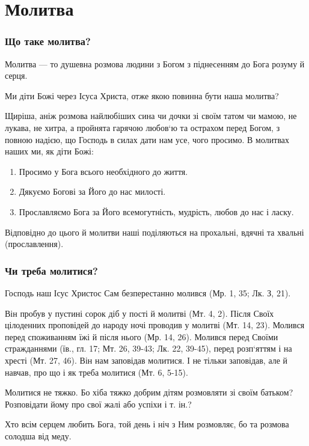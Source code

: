 \documentclass[main.tex]{subfiles}
\begin{document}
\chapter{Молитва}

\subsection{Що таке молитва?}

Молитва — то душевна розмова людини з Богом з піднесенням до Бога розуму й серця.

Ми діти Божі через Ісуса Христа, отже якою повинна бути наша молитва?

Щиріша, аніж розмова найлюбіших сина чи дочки зі своїм татом чи мамою, не лукава, не хитра, а пройнята гарячою любов`ю та острахом перед Богом, з повною надією, що Господь в силах дати нам усе, чого просимо. В молитвах наших ми, як діти Божі:

\begin{enumerate}
    \item Просимо у Бога всього необхідного до життя.
    \item Дякуємо Богові за Його до нас милості.
    \item Прославляємо Бога за Його всемогутність, мудрість, любов до нас і ласку.
\end{enumerate}

Відповідно до цього й молитви наші поділяються на прохальні, вдячні та хвальні (прославлення).

\subsection{Чи треба молитися?}

Господь наш Ісус Христос Сам безперестанно молився (Мр. 1, 35; Лк. З, 21).

Він пробув у пустині сорок діб у пості й молитві (Мт. 4, 2). Після Своїх цілоденних проповідей до народу ночі проводив у молитві (Мт. 14, 23). Молився перед споживанням їжі й після нього (Мр. 14, 26). Молився перед Своїми стражданнями (їв., гл. 17; Мт. 26, 39-43; Лк. 22, 39-45), перед розп`яттям і на хресті (Мт. 27, 46). Він нам заповідав молитися. І не тільки заповідав, але й навчав, про що і як треба молитися (Мт. 6, 5-15).

Молитися не тяжко. Бо хіба тяжко добрим дітям розмовляти зі своїм батьком? Розповідати йому про свої жалі або успіхи і т. ін.?

Хто всім серцем любить Бога, той день і ніч з Ним розмовляє, бо та розмова солодша від меду.
\end{document}
